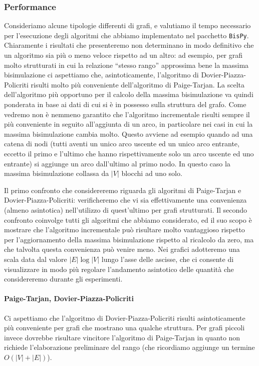 \subsubsection{Performance}
Consideriamo alcune tipologie differenti di grafi, e valutiamo il tempo necessario per l'esecuzione degli algoritmi che abbiamo implementato nel pacchetto \texttt{BisPy}. Chiaramente i risultati che presenteremo non determinano in modo definitivo che un algoritmo sia più o meno veloce rispetto ad un altro: ad esempio, per grafi molto strutturati in cui la relazione ``stesso rango'' approssima bene la massima bisimulazione ci aspettiamo che, asintoticamente, l'algoritmo di Dovier-Piazza-Policriti risulti molto più conveniente dell'algoritmo di Paige-Tarjan. La scelta dell'algoritmo più opportuno per il calcolo della massima bisimulazione va quindi ponderata in base ai dati di cui si è in possesso sulla struttura del grafo. Come vedremo non è nemmeno garantito che l'algoritmo incrementale risulti sempre il più conveniente in seguito all'aggiunta di un arco, in particolare nei casi in cui la massima bisimulazione cambia molto. Questo avviene ad esempio quando ad una catena di nodi (tutti aventi un unico arco uscente ed un unico arco entrante, eccetto il primo e l'ultimo che hanno rispettivamente solo un arco uscente ed uno entrante) si aggiunge un arco dall'ultimo al primo nodo. In questo caso la massima bisimulazione collassa da $|V|$ blocchi ad uno solo.

Il primo confronto che considereremo riguarda gli algoritmi di Paige-Tarjan e Dovier-Piazza-Policriti: verificheremo che vi sia effettivamente una convenienza (almeno asintotica) nell'utilizzo di quest'ultimo per grafi strutturati. Il secondo confronto coinvolge tutti gli algoritmi che abbiamo considerato, ed il suo scopo è mostrare che l'algoritmo incrementale può risultare molto vantaggioso rispetto per l'aggiornamento della massima bisimulazione rispetto al ricalcolo da zero, ma che talvolta questa convenienza può venire meno. Nei grafici adotteremo una scala data dal valore $|E| \log |V|$ lungo l'asse delle ascisse, che ci consente di visualizzare in modo più regolare l'andamento asintotico delle quantità che considereremo durante gli esperimenti.

\paragraph{Paige-Tarjan, Dovier-Piazza-Policriti} Ci aspettiamo che l'algoritmo di Dovier-Piazza-Policriti risulti asintoticamente più conveniente per grafi che mostrano una qualche struttura. Per grafi piccoli invece dovrebbe risultare vincitore l'algoritmo di Paige-Tarjan in quanto non richiede l'elaborazione preliminare del rango (che ricordiamo aggiunge un termine $O(|V| + |E|)$).

